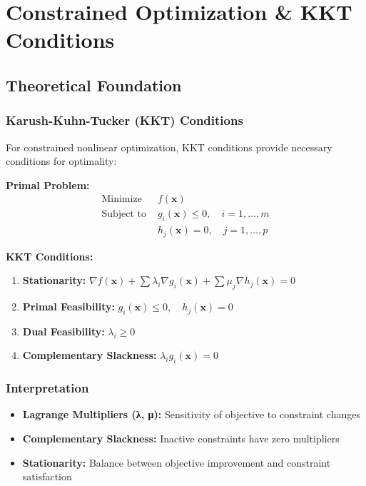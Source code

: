 \documentclass[
  letterpaper,
  DIV=11,
  numbers=noendperiod]{scrreprt}
\providecommand{\tightlist}{%
  \setlength{\itemsep}{0pt}\setlength{\parskip}{0pt}}
\begin{document}
\section{Constrained Optimization \& KKT
Conditions}\label{constrained-optimization-kkt-conditions}

\subsection{Theoretical Foundation}\label{theoretical-foundation-2}

\subsubsection{Karush-Kuhn-Tucker (KKT)
Conditions}\label{karush-kuhn-tucker-kkt-conditions}

For constrained nonlinear optimization, KKT conditions provide necessary
conditions for optimality:

\textbf{Primal Problem:} \[
\begin{aligned}
\text{Minimize } & f(\mathbf{x}) \\
\text{Subject to } & g_i(\mathbf{x}) \leq 0, \quad i = 1, \ldots, m \\
& h_j(\mathbf{x}) = 0, \quad j = 1, \ldots, p
\end{aligned}
\]

\textbf{KKT Conditions:}

\begin{enumerate}
\def\labelenumi{\arabic{enumi}.}
\tightlist
\item
  \textbf{Stationarity:}
  \(\nabla f(\mathbf{x}) + \sum \lambda_i \nabla g_i(\mathbf{x}) + \sum \mu_j \nabla h_j(\mathbf{x}) = 0\)
\item
  \textbf{Primal Feasibility:}
  \(g_i(\mathbf{x}) \leq 0, \quad h_j(\mathbf{x}) = 0\)
\item
  \textbf{Dual Feasibility:} \(\lambda_i \geq 0\)
\item
  \textbf{Complementary Slackness:} \(\lambda_i g_i(\mathbf{x}) = 0\)
\end{enumerate}

\subsubsection{Interpretation}\label{interpretation}

\begin{itemize}
\tightlist
\item
  \textbf{Lagrange Multipliers (λ, μ):} Sensitivity of objective to
  constraint changes
\item
  \textbf{Complementary Slackness:} Inactive constraints have zero
  multipliers
\item
  \textbf{Stationarity:} Balance between objective improvement and
  constraint satisfaction
\end{itemize}
\end{document}
